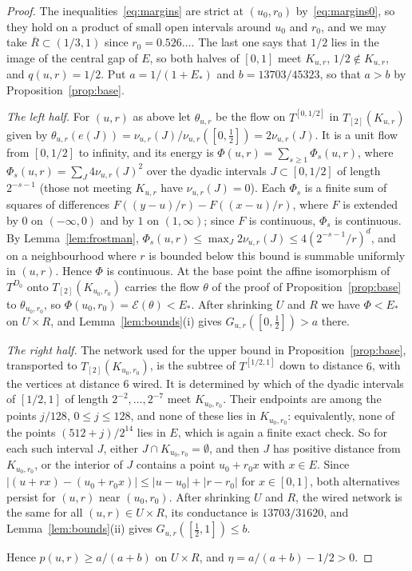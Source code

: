 \documentclass[11pt]{amsart}
\theoremstyle{remark}
\begin{document}
\begin{proof}
The inequalities~\eqref{eq:margins} are strict at $(u_0,r_0)$ by~\eqref{eq:margins0}, so they hold on a product of small open intervals around $u_0$ and $r_0$, and we may take $\overline R\subset(1/3,1)$ since $r_0=0.526\ldots$. The last one says that $1/2$ lies in the image of the central gap of $E$, so both halves of $[0,1]$ meet $K_{u,r}$, $1/2\notin K_{u,r}$, and $q(u,r)=1/2$. Put $a=1/(1+E_*)$ and $b=13703/45323$, so that $a>b$ by Proposition~\ref{prop:base}.

\emph{The left half.} For $(u,r)$ as above let $\theta_{u,r}$ be the flow on $T^{[0,1/2]}$ in $T_{[2]}(K_{u,r})$ given by $\theta_{u,r}(e(J))=\nu_{u,r}(J)/\nu_{u,r}([0,\tfrac12])=2\nu_{u,r}(J)$. It is a unit flow from $[0,1/2]$ to infinity, and its energy is $\Phi(u,r)=\sum_{s\ge1}\Phi_s(u,r)$, where $\Phi_s(u,r)=\sum_J4\nu_{u,r}(J)^2$ over the dyadic intervals $J\subset[0,1/2]$ of length $2^{-s-1}$ (those not meeting $K_{u,r}$ have $\nu_{u,r}(J)=0$). Each $\Phi_s$ is a finite sum of squares of differences $F((y-u)/r)-F((x-u)/r)$, where $F$ is extended by $0$ on $(-\infty,0)$ and by $1$ on $(1,\infty)$; since $F$ is continuous, $\Phi_s$ is continuous. By Lemma~\ref{lem:frostman}, $\Phi_s(u,r)\le\max_J2\nu_{u,r}(J)\le4(2^{-s-1}/r)^d$, and on a neighbourhood where $r$ is bounded below this bound is summable uniformly in $(u,r)$. Hence $\Phi$ is continuous. At the base point the affine isomorphism of $T^{D_0}$ onto $T_{[2]}(K_{u_0,r_0})$ carries the flow $\theta$ of the proof of Proposition~\ref{prop:base} to $\theta_{u_0,r_0}$, so $\Phi(u_0,r_0)=\mathcal E(\theta)<E_*$. After shrinking $U$ and $R$ we have $\Phi<E_*$ on $U\times R$, and Lemma~\ref{lem:bounds}(i) gives $G_{u,r}([0,\tfrac12])>a$ there.

\emph{The right half.} The network used for the upper bound in Proposition~\ref{prop:base}, transported to $T_{[2]}(K_{u_0,r_0})$, is the subtree of $T^{[1/2,1]}$ down to distance $6$, with the vertices at distance $6$ wired. It is determined by which of the dyadic intervals of $[1/2,1]$ of length $2^{-2},\dots,2^{-7}$ meet $K_{u_0,r_0}$. Their endpoints are among the points $j/128$, $0\le j\le128$, and none of these lies in $K_{u_0,r_0}$: equivalently, none of the points $(512+j)/2^{14}$ lies in $E$, which is again a finite exact check. So for each such interval $J$, either $J\cap K_{u_0,r_0}=\emptyset$, and then $J$ has positive distance from $K_{u_0,r_0}$, or the interior of $J$ contains a point $u_0+r_0x$ with $x\in E$. Since $|(u+rx)-(u_0+r_0x)|\le|u-u_0|+|r-r_0|$ for $x\in[0,1]$, both alternatives persist for $(u,r)$ near $(u_0,r_0)$. After shrinking $U$ and $R$, the wired network is the same for all $(u,r)\in U\times R$, its conductance is $13703/31620$, and Lemma~\ref{lem:bounds}(ii) gives $G_{u,r}([\tfrac12,1])\le b$.

Hence $p(u,r)\ge a/(a+b)$ on $U\times R$, and $\eta=a/(a+b)-1/2>0$.
\end{proof}
\end{document}

